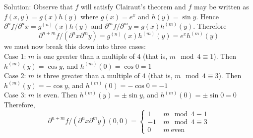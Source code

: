 \documentclass[12pt]{amsbook}
\begin{document}
\begin{enumerate}
\\
\\
{\sc Solution}: Observe that $f$ will satisfy Clairaut's theorem and $f$ may be written as $f(x,y)=g(x)h(y)$ where $g(x)=e^x$ and $h(y)=\sin y$. Hence $\partial^n f/\partial^n x = g^{(n)}(x)h(y)$ and $\partial^m f/\partial^m y = g(x)h^{(m)}(y)$. Therefore
$$\partial^{n+m}f/(\partial^n x \partial^m y)=g^{(n)}(x)h^{(m)}(y)=e^xh^{(m)}(y)$$
we must now break this down into three cases:
\\
Case 1: $m$ is one greater than a multiple of $4$ (that is, $m \mod 4 \equiv 1$). Then $h^{(m)}(y)=\cos y$, and $h^{(m)}(0)=\cos 0 =1$
\\
Case 2: $m$ is three greater than a multiple of $4$ (that is, $m \mod 4 \equiv 3$). Then $h^{(m)}(y)=-\cos y$, and $h^{(m)}(0)=-\cos 0 =-1$
\\
Case 3: $m$ is even. Then $h^{(m)}(y)=\pm \sin y$, and $h^{(m)}(0)=\pm \sin 0 =0$
\\
Therefore,
$$\partial^{n+m}f/(\partial^n x \partial^m y)(0,0)= \begin{cases} 
1& \  m \mod 4 \equiv 1\\
-1& \  m \mod 4 \equiv 3\\
0& \ m \ \text{even}
\end{cases}$$
\end{enumerate}
\end{document}
